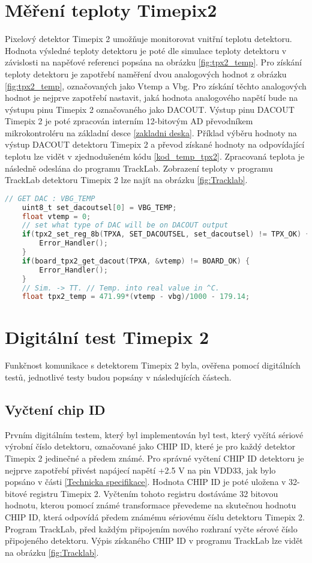\section{Měření teploty Timepix2}
\label{teplota}
Pixelový detektor Timepix 2 umožňuje monitorovat vnitřní teplotu detektoru. Hodnota výsledné teploty detektoru je poté dle simulace teploty detektoru v závislosti na napěťové referenci popsána na obrázku \ref{fig:tpx2_temp}. Pro získání teploty detektoru je zapotřebí naměření dvou analogových hodnot z obrázku \ref{fig:tpx2_temp}, označovaných jako Vtemp a Vbg. Pro získání těchto analogových hodnot je nejprve zapotřebí nastavit, jaká hodnota analogového napětí bude na výstupu pinu Timepix 2 označovaného jako DACOUT. Výstup pinu DACOUT Timepix 2 je poté zpracován interním 12-bitovým AD převodníkem mikrokontroléru na základní desce \ref{zakladni deska}. Příklad výběru hodnoty na výstup DACOUT detektoru Timepix 2 a převod získané hodnoty na odpovídající teplotu lze vidět v zjednodušeném kódu \ref{kod_temp_tpx2}. Zpracovaná teplota je následně odeslána do programu TrackLab. Zobrazení teploty v programu TrackLab detektoru Timepix 2 lze najít na obrázku \ref{fig:Tracklab}.  
\begin{lstlisting}[frame=single, language=C, caption={Výběr výstupu DACOUT detektoru Timepix2 a odečtení hodnoty detektoru.}, label=kod_temp_tpx2]
	// GET DAC : VBG_TEMP
	uint8_t set_dacoutsel[0] = VBG_TEMP; 
	float vtemp = 0;
	// set what type of DAC will be on DACOUT output								   
	if(tpx2_set_reg_8b(TPXA, SET_DACOUTSEL, set_dacoutsel) != TPX_OK) {    
		Error_Handler();
	}
	if(board_tpx2_get_dacout(TPXA, &vtemp) != BOARD_OK) {
		Error_Handler();
	}
	// Sim. -> TT. // Temp. into real value in ^C.
	float tpx2_temp = 471.99*(vtemp - vbg)/1000 - 179.14;					
\end{lstlisting}

\section{Digitální test Timepix 2} %
Funkčnost komunikace s detektorem Timepix 2 byla, ověřena pomocí digitálních testů, jednotlivé testy budou popsány v následujících částech.
	\subsection{Vyčtení chip ID}
	Prvním digitálním testem, který byl implementován byl test, který vyčítá sériové výrobní číslo detektoru, označované jako CHIP ID, které je pro každý detektor Timepix 2 jedinečné a předem známé. Pro správné vyčtení CHIP ID detektoru je nejprve zapotřebí přivést napájecí napětí +2.5 V na pin VDD33, jak bylo popsáno v části \ref{Technicka specifikace}. Hodnota CHIP ID je poté uložena v 32-bitové registru Timepix 2. Vyčtením tohoto registru dostáváme 32 bitovou hodnotu, kterou pomocí známé transformace převedeme na skutečnou hodnotu CHIP ID, která odpovídá předem známému sériovému číslu detektoru Timepix 2. Program TrackLab, před každým připojením nového rozhraní vyčte sérové číslo připojeného detektoru. Výpis získaného CHIP ID v programu TrackLab lze vidět na obrázku \ref{fig:Tracklab}.

